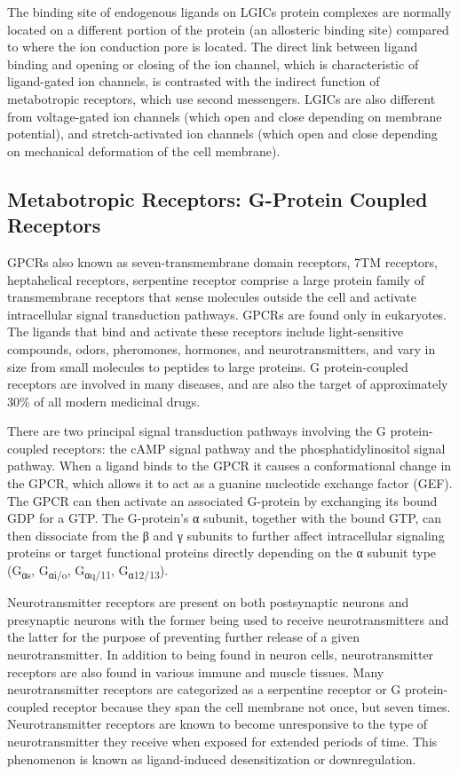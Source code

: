 The binding site of endogenous ligands on LGICs protein complexes are normally located on a different portion of the protein (an allosteric binding site) compared to where the ion conduction pore is located. The direct link between ligand binding and opening or closing of the ion channel, which is characteristic of ligand-gated ion channels, is contrasted with the indirect function of metabotropic receptors, which use second messengers. LGICs are also different from voltage-gated ion channels (which open and close depending on membrane potential), and stretch-activated ion channels (which open and close depending on mechanical deformation of the cell membrane).

\hypertarget{metabotropic-receptors-g-protein-coupled-receptors}{%
\subsection{Metabotropic Receptors: G-Protein Coupled Receptors}\label{metabotropic-receptors-g-protein-coupled-receptors}}

GPCRs also known as seven-transmembrane domain receptors, 7TM receptors, heptahelical receptors, serpentine receptor comprise a large protein family of transmembrane receptors that sense molecules outside the cell and activate intracellular signal transduction pathways. GPCRs are found only in eukaryotes. The ligands that bind and activate these receptors include light-sensitive compounds, odors, pheromones, hormones, and neurotransmitters, and vary in size from small molecules to peptides to large proteins. G protein-coupled receptors are involved in many diseases, and are also the target of approximately 30\% of all modern medicinal drugs.

There are two principal signal transduction pathways involving the G protein-coupled receptors: the cAMP signal pathway and the phosphatidylinositol signal pathway. When a ligand binds to the GPCR it causes a conformational change in the GPCR, which allows it to act as a guanine nucleotide exchange factor (GEF). The GPCR can then activate an associated G-protein by exchanging its bound GDP for a GTP. The G-protein's α subunit, together with the bound GTP, can then dissociate from the β and γ subunits to further affect intracellular signaling proteins or target functional proteins directly depending on the α subunit type (G\textsubscript{αs}, G\textsubscript{αi/o}, G\textsubscript{αq/11}, G\textsubscript{α12/13}).

Neurotransmitter receptors are present on both postsynaptic neurons and presynaptic neurons with the former being used to receive neurotransmitters and the latter for the purpose of preventing further release of a given neurotransmitter. In addition to being found in neuron cells, neurotransmitter receptors are also found in various immune and muscle tissues. Many neurotransmitter receptors are categorized as a serpentine receptor or G protein-coupled receptor because they span the cell membrane not once, but seven times. Neurotransmitter receptors are known to become unresponsive to the type of neurotransmitter they receive when exposed for extended periods of time. This phenomenon is known as ligand-induced desensitization or downregulation.

